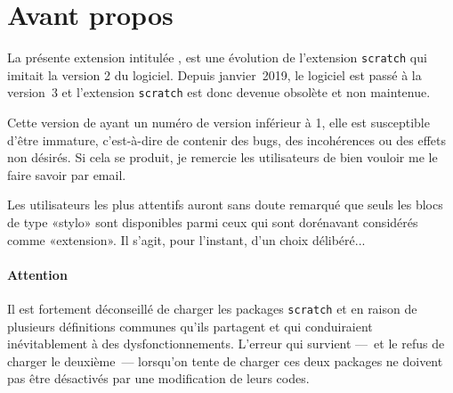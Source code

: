 \documentclass[french,a4paper,10pt]{article}
\makeatletter
\def\SCRATCH{\texttt{scratch}\xspace}
\def\SSCRATCH{\texttt{\scrname}\xspace}
\def\longfrscrdate@i#1/#2/#3\@nil{\number#3\relax\ifnum\number#3=1 \noexpand\ier\fi\space \ifcase#2 \or janvier\or février\or mars\or avril\or mai\or juin\or juillet\or aout\or septembre\or octobre\or novembre\or décembre\fi\space#1}
\edef\longfrscrdate{\expandafter\longfrscrdate@i\scrdate\@nil}
\makeatother
\begin{document}
\parindent=0pt
\thispagestyle{empty}
\parindent0pt
\section{Avant propos}
La présente extension intitulée \SSCRATCH, est une évolution de l'extension \SCRATCH qui imitait la version 2 du logiciel. Depuis janvier~2019, le logiciel est passé à la version~3 et l'extension \SCRATCH est donc devenue obsolète et non maintenue.\medbreak

Cette version de \SSCRATCH ayant un numéro de version inférieur à 1, elle est susceptible d'être immature, c'est-à-dire de contenir des bugs, des incohérences ou des effets non désirés. Si cela se produit, je remercie les utilisateurs de bien vouloir me le faire savoir par email.\medbreak

Les utilisateurs les plus attentifs auront sans doute remarqué que seuls les blocs de type «stylo» sont disponibles parmi ceux qui sont dorénavant considérés comme «extension». Il s'agit, pour l'instant, d'un choix délibéré...

\paragraph{Attention} Il est fortement déconseillé de charger les packages \SCRATCH et \SSCRATCH en raison de plusieurs définitions communes qu'ils partagent et qui conduiraient inévitablement à des dysfonctionnements. L'erreur qui survient ---~et le refus de charger le deuxième~--- lorsqu'on tente de charger ces deux packages ne doivent pas être désactivés par une modification de leurs codes.\medbreak
\end{document}
